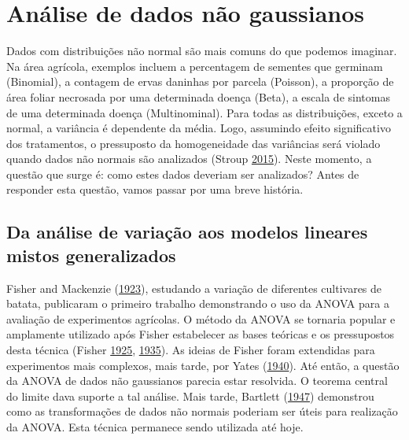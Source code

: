 \documentclass[
]{book}
\numberwithin{equation}{section}
\newcommand{\indt}[1]{\index{#1|ST}}
\begin{document}
\hypertarget{general}{%
\section{Análise de dados não gaussianos}\label{general}}

Dados com distribuições não normal são mais comuns do que podemos imaginar. Na área agrícola, exemplos incluem a percentagem de sementes que germinam (Binomial), a contagem de ervas daninhas por parcela (Poisson), a proporção de área foliar necrosada por uma determinada doença (Beta), a escala de sintomas de uma determinada doença (Multinominal). Para todas as distribuições, exceto a normal, a variância é dependente da média. Logo, assumindo efeito significativo dos tratamentos, o pressuposto da homogeneidade das variâncias será violado quando dados não normais são analizados (Stroup \protect\hyperlink{ref-Stroup2015}{2015}). Neste momento, a questão que surge é: como estes dados deveriam ser analizados? Antes de responder esta questão, vamos passar por uma breve história.

\hypertarget{da-anuxe1lise-de-variauxe7uxe3o-aos-modelos-lineares-mistos-generalizados}{%
\subsection{Da análise de variação aos modelos lineares mistos generalizados}\label{da-anuxe1lise-de-variauxe7uxe3o-aos-modelos-lineares-mistos-generalizados}}

Fisher and Mackenzie (\protect\hyperlink{ref-Fisher1923}{1923}), estudando a variação de diferentes cultivares de batata, publicaram o primeiro trabalho demonstrando o uso da ANOVA\indt{ANOVA} para a avaliação de experimentos agrícolas. O método da ANOVA\indt{ANOVA} se tornaria popular e amplamente utilizado após Fisher estabelecer as bases teóricas e os pressupostos desta técnica (Fisher \protect\hyperlink{ref-Fisher1925}{1925}, \protect\hyperlink{ref-Fisher1935}{1935}). As ideias de Fisher foram extendidas para experimentos mais complexos, mais tarde, por Yates (\protect\hyperlink{ref-Yates1940}{1940}). Até então, a questão da ANOVA\indt{ANOVA} de dados não gaussianos parecia estar resolvida. O teorema central do limite dava suporte a tal análise. Mais tarde, Bartlett (\protect\hyperlink{ref-Bartlett1947}{1947}) demonstrou como as transformações de dados não normais poderiam ser úteis para realização da ANOVA. Esta técnica permanece sendo utilizada até hoje.
\end{document}
